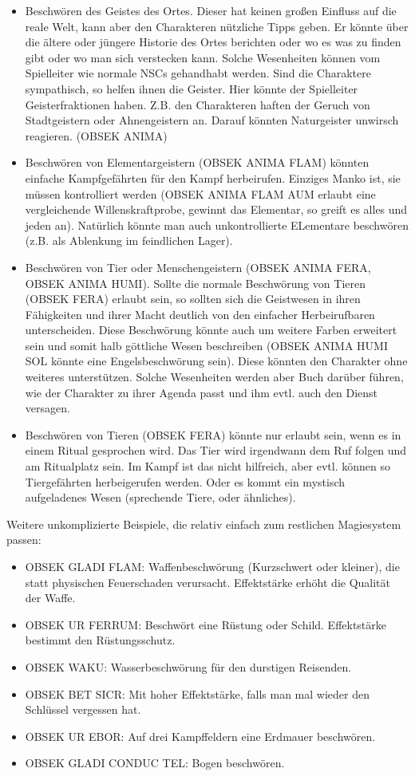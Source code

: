 \documentclass{article}
\begin{document}
\begin{itemize}
\item Beschwören des Geistes des Ortes. Dieser hat keinen großen Einfluss auf die reale Welt, kann aber den Charakteren nützliche Tipps geben. Er könnte über die ältere oder jüngere Historie des Ortes berichten oder wo es was zu finden gibt oder wo man sich verstecken kann. Solche Wesenheiten können vom Spielleiter wie normale NSCs gehandhabt werden. Sind die Charaktere sympathisch, so helfen ihnen die Geister. Hier könnte der Spielleiter Geisterfraktionen haben. Z.B. den Charakteren haften der Geruch von Stadtgeistern oder Ahnengeistern an. Darauf könnten Naturgeister unwirsch reagieren. (OBSEK ANIMA)
\item Beschwören von Elementargeistern (OBSEK ANIMA FLAM) könnten einfache Kampfgefährten für den Kampf herbeirufen. Einziges Manko ist, sie müssen kontrolliert werden (OBSEK ANIMA FLAM AUM erlaubt eine vergleichende Willenskraftprobe, gewinnt das Elementar, so greift es alles und jeden an). Natürlich könnte man auch unkontrollierte ELementare beschwören (z.B. als Ablenkung im feindlichen Lager).
\item Beschwören von Tier oder Menschengeistern (OBSEK ANIMA FERA, OBSEK ANIMA HUMI). Sollte die normale Beschwörung von Tieren (OBSEK FERA) erlaubt sein, so sollten sich die Geistwesen in ihren Fähigkeiten und ihrer Macht deutlich von den einfacher Herbeirufbaren unterscheiden. Diese Beschwörung könnte auch um weitere Farben erweitert sein und somit halb göttliche Wesen beschreiben (OBSEK ANIMA HUMI SOL könnte eine Engelsbeschwörung sein). Diese könnten den Charakter ohne weiteres unterstützen. Solche Wesenheiten werden aber Buch darüber führen, wie der Charakter zu ihrer Agenda passt und ihm evtl. auch den Dienst versagen.
\item Beschwören von Tieren (OBSEK FERA) könnte nur erlaubt sein, wenn es in einem Ritual gesprochen wird. Das Tier wird irgendwann dem Ruf folgen und am Ritualplatz sein. Im Kampf ist das nicht hilfreich, aber evtl. können so Tiergefährten herbeigerufen werden. Oder es kommt ein mystisch aufgeladenes Wesen (sprechende Tiere, oder ähnliches).
\end{itemize}

Weitere unkomplizierte Beispiele, die relativ einfach zum restlichen Magiesystem passen:

\begin{itemize}
\item OBSEK GLADI FLAM: Waffenbeschwörung (Kurzschwert oder kleiner), die statt physischen Feuerschaden verursacht. Effektstärke erhöht die Qualität der Waffe.
\item OBSEK UR FERRUM: Beschwört eine Rüstung oder Schild. Effektstärke bestimmt den Rüstungsschutz.
\item OBSEK WAKU: Wasserbeschwörung für den durstigen Reisenden.
\item OBSEK BET SICR: Mit hoher Effektstärke, falls man mal wieder den Schlüssel vergessen hat.
\item OBSEK UR EBOR: Auf drei Kampffeldern eine Erdmauer beschwören.
\item OBSEK GLADI CONDUC TEL: Bogen beschwören.
\end{itemize}
\end{document}
